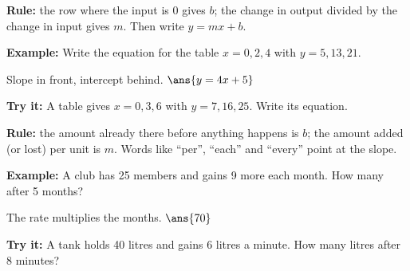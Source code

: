 \documentclass[12pt]{article}
\begin{document}


\begin{formulabox}
\textbf{Rule:} the row where the input is 0 gives $b$; the change in output
divided by the change in input gives $m$. Then write $y = mx + b$.
\end{formulabox}

\begin{examplebox}
\textbf{Example:} \quad Write the equation for the table $x = 0, 2, 4$ with
$y = 5, 13, 21$.

Slope in front, intercept behind. \quad $\ans{y = 4x + 5}$
\end{examplebox}

\begin{tryitbox}
\textbf{Try it:} \quad A table gives $x = 0, 3, 6$ with $y = 7, 16, 25$. Write
its equation.\\[2pt]
\end{tryitbox}


\begin{formulabox}
\textbf{Rule:} the amount already there before anything happens is $b$; the
amount added (or lost) per unit is $m$. Words like ``per'', ``each'' and
``every'' point at the slope.
\end{formulabox}

\begin{examplebox}
\textbf{Example:} \quad A club has 25 members and gains 9 more each month.
How many after 5 months?

The rate multiplies the months. \quad $\ans{70}$
\end{examplebox}

\begin{tryitbox}
\textbf{Try it:} \quad A tank holds 40 litres and gains 6 litres a minute. How
many litres after 8 minutes?\\[2pt]
\end{tryitbox}
\end{document}
